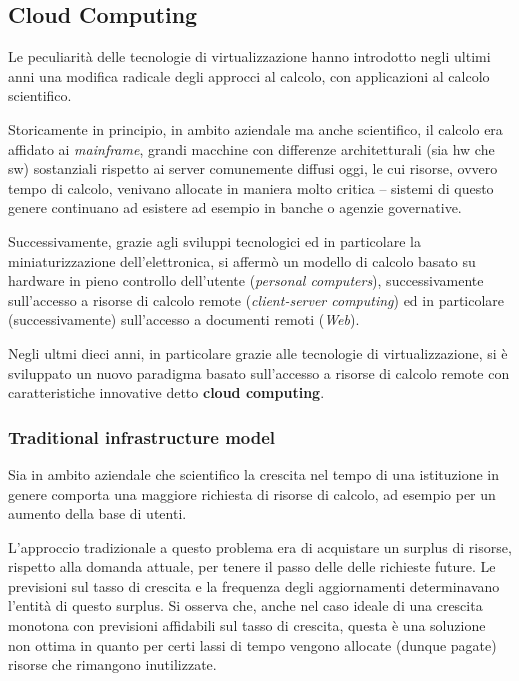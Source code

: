 \documentclass[italian,]{article}
\begin{document}
\subsection{Cloud Computing}\label{cloud-computing}

Le peculiarità delle tecnologie di virtualizzazione hanno introdotto
negli ultimi anni una modifica radicale degli approcci al calcolo, con
applicazioni al calcolo scientifico.

Storicamente in principio, in ambito aziendale ma anche scientifico, il
calcolo era affidato ai \emph{mainframe}, grandi macchine con differenze
architetturali (sia hw che sw) sostanziali rispetto ai server
comunemente diffusi oggi, le cui risorse, ovvero tempo di calcolo,
venivano allocate in maniera molto critica -- sistemi di questo genere
continuano ad esistere ad esempio in banche o agenzie governative.

Successivamente, grazie agli sviluppi tecnologici ed in particolare la
miniaturizzazione dell'elettronica, si affermò un modello di calcolo
basato su hardware in pieno controllo dell'utente (\emph{personal
computers}), successivamente sull'accesso a risorse di calcolo remote
(\emph{client-server computing}) ed in particolare (successivamente)
sull'accesso a documenti remoti (\emph{Web}).

Negli ultmi dieci anni, in particolare grazie alle tecnologie di
virtualizzazione, si è sviluppato un nuovo paradigma basato sull'accesso
a risorse di calcolo remote con caratteristiche innovative detto
\textbf{cloud computing}.

\subsubsection{Traditional infrastructure
model}\label{traditional-infrastructure-model}

Sia in ambito aziendale che scientifico la crescita nel tempo di una
istituzione in genere comporta una maggiore richiesta di risorse di
calcolo, ad esempio per un aumento della base di utenti.

L'approccio tradizionale a questo problema era di acquistare un surplus
di risorse, rispetto alla domanda attuale, per tenere il passo delle
delle richieste future. Le previsioni sul tasso di crescita e la
frequenza degli aggiornamenti determinavano l'entità di questo surplus.
Si osserva che, anche nel caso ideale di una crescita monotona con
previsioni affidabili sul tasso di crescita, questa è una soluzione non
ottima in quanto per certi lassi di tempo vengono allocate (dunque
pagate) risorse che rimangono inutilizzate.
\end{document}
